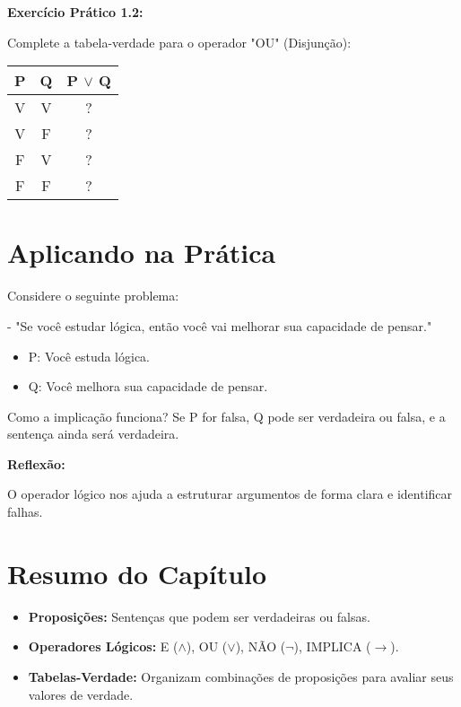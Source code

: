 \documentclass[a4paper,12pt]{book}
\begin{document}
\textbf{Exercício Prático 1.2:}

Complete a tabela-verdade para o operador "OU" (Disjunção):
\begin{table}[h!]
\centering
\begin{tabular}{|c|c|c|}
\hline
P & Q & P \(\lor\) Q \\
\hline
V & V & ? \\
V & F & ? \\
F & V & ? \\
F & F & ? \\
\hline
\end{tabular}
\end{table}

\section{Aplicando na Prática}
Considere o seguinte problema:

- "Se você estudar lógica, então você vai melhorar sua capacidade de pensar."
    \begin{itemize}
        \item P: Você estuda lógica.
        \item Q: Você melhora sua capacidade de pensar.
    \end{itemize}
Como a implicação funciona? Se P for falsa, Q pode ser verdadeira ou falsa, e a sentença ainda será verdadeira.

\textbf{Reflexão:}

O operador lógico nos ajuda a estruturar argumentos de forma clara e identificar falhas.

\newpage

\section*{Resumo do Capítulo}
\begin{itemize}
    \item \textbf{Proposições:} Sentenças que podem ser verdadeiras ou falsas.
    \item \textbf{Operadores Lógicos:} E (\(\land\)), OU (\(\lor\)), NÃO (\(\neg\)), IMPLICA (\(\rightarrow\)).
    \item \textbf{Tabelas-Verdade:} Organizam combinações de proposições para avaliar seus valores de verdade.
\end{itemize}
\end{document}
